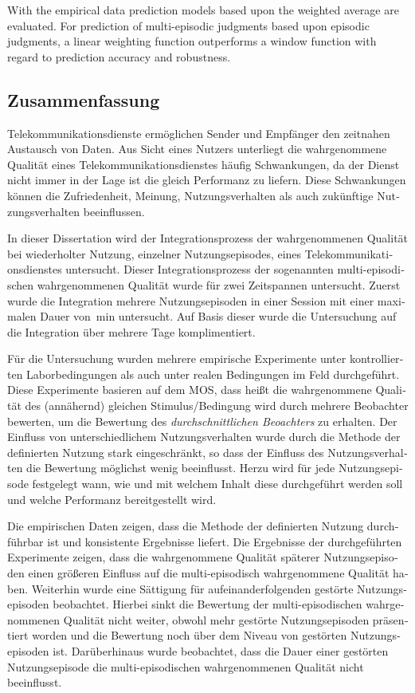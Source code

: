 With the empirical data prediction models based upon the weighted average are evaluated.
For prediction of multi-episodic judgments based upon episodic judgments, a linear weighting function outperforms a window function with regard to prediction accuracy and robustness.

\begin{otherlanguage}{ngerman}
\chapter*{Zusammenfassung}
Telekommunikationsdienste ermöglichen Sender und Empfänger den zeitnahen Austausch von Daten.
Aus Sicht eines Nutzers unterliegt die wahrgenommene Qualität eines Telekommunikationsdienstes häufig Schwankungen, da der Dienst nicht immer in der Lage ist die gleich Performanz zu liefern.
Diese Schwankungen können die Zufriedenheit, Meinung, Nutzungsverhalten als auch zukünftige Nutzungsverhalten beeinflussen.

In dieser Dissertation wird der Integrationsprozess der wahrgenommenen Qualität bei wiederholter Nutzung, einzelner Nutzungsepisodes, eines Telekommunikationsdienstes untersucht.
Dieser Integrationsprozess der sogenannten multi-episodischen wahrgenommenen Qualität wurde für zwei Zeitspannen untersucht.
Zuerst wurde die Integration mehrere Nutzungsepisoden in einer Session mit einer maximalen Dauer von~\unit[45]{min} untersucht.
Auf Basis dieser wurde die Untersuchung auf die Integration über mehrere Tage komplimentiert.

Für die Untersuchung wurden mehrere empirische Experimente unter kontrollierten Laborbedingungen als auch unter realen Bedingungen im Feld durchgeführt.
Diese Experimente basieren auf dem \acs{MOS}, dass heißt die wahrgenommene Qualität des (annähernd) gleichen Stimulus/Bedingung wird durch mehrere Beobachter bewerten, um die Bewertung des \emph{durchschnittlichen Beoachters} zu erhalten.
Der Einfluss von unterschiedlichem Nutzungsverhalten wurde durch die Methode der definierten Nutzung stark eingeschränkt, so dass der Einfluss des Nutzungsverhalten die Bewertung möglichst wenig beeinflusst.
Herzu wird für jede Nutzungsepisode festgelegt wann, wie und mit welchem Inhalt diese durchgeführt werden soll und welche Performanz bereitgestellt wird.

Die empirischen Daten zeigen, dass die Methode der definierten Nutzung durchführbar ist und konsistente Ergebnisse liefert.
Die Ergebnisse der durchgeführten Experimente zeigen, dass die wahrgenommene Qualität späterer Nutzungsepisoden einen größeren Einfluss auf die multi-episodisch wahrgenommene Qualität haben.
Weiterhin wurde eine Sättigung für aufeinanderfolgenden gestörte Nutzungsepisoden beobachtet.
Hierbei sinkt die Bewertung der multi-episodischen wahrgenommenen Qualität nicht weiter, obwohl mehr gestörte Nutzungsepisoden präsentiert worden und die Bewertung noch über dem Niveau von gestörten Nutzungsepisoden ist.
Darüberhinaus wurde beobachtet, dass die Dauer einer gestörten Nutzungsepisode die multi-episodischen wahrgenommenen Qualität nicht beeinflusst.


\end{otherlanguage}
